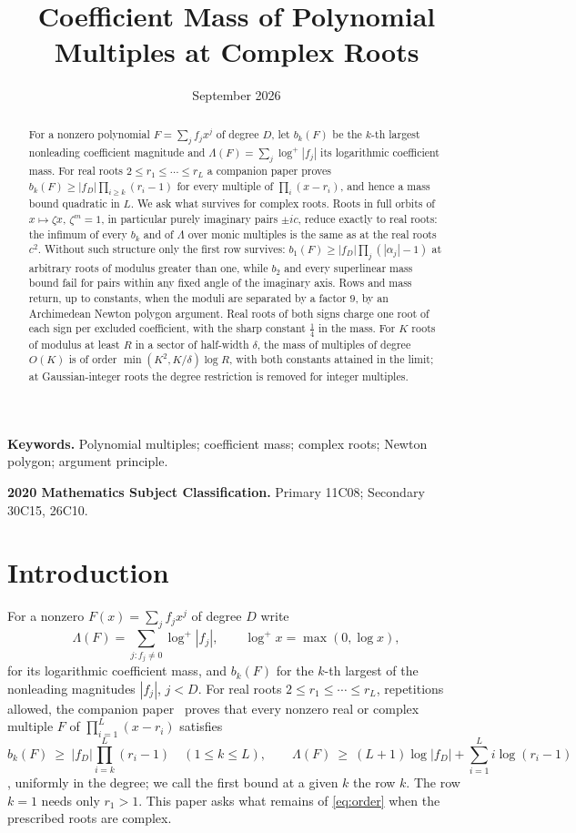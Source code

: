 \documentclass[11pt]{article}
\title{Coefficient Mass of Polynomial Multiples at Complex Roots}
\author{\shortstack{Bangyen Pham\\
\small Independent Researcher\\
\small\href{mailto:bangyenp@gmail.com}{\texttt{bangyenp@gmail.com}}\\
\small\href{https://orcid.org/0009-0006-9928-2088}{ORCID: 0009-0006-9928-2088}}}
\date{September 2026}
\begin{document}
\maketitle

\begin{abstract}
For a nonzero polynomial $F=\sum_jf_jx^j$ of degree $D$, let $b_k(F)$ be the
$k$-th largest nonleading coefficient magnitude and
$\Lambda(F)=\sum_j\log^+|f_j|$ its logarithmic coefficient mass.  For real
roots $2\le r_1\le\cdots\le r_L$ a companion paper proves
$b_k(F)\ge|f_D|\prod_{i\ge k}(r_i-1)$ for every multiple of
$\prod_i(x-r_i)$, and hence a mass bound quadratic in $L$.  We ask what
survives for complex roots.  Roots in full orbits of $x\mapsto\zeta x$,
$\zeta^m=1$, in particular purely imaginary pairs $\pm ic$, reduce exactly to
real roots: the infimum of every $b_k$ and of $\Lambda$ over monic multiples
is the same as at the real roots $c^2$.  Without such structure only the
first row survives: $b_1(F)\ge|f_D|\prod_j(|\alpha_j|-1)$ at arbitrary roots
of modulus greater than one, while $b_2$ and every superlinear mass bound
fail for pairs within any fixed angle of the imaginary axis.  Rows and mass
return, up to constants, when the moduli are separated by a factor $9$, by
an Archimedean Newton polygon argument.  Real roots of both signs charge one
root of each sign per excluded coefficient, with the sharp constant
$\frac14$ in the mass.  For $K$ roots of modulus at least $R$ in a sector of
half-width $\delta$, the mass of multiples of degree $O(K)$ is of order
$\min(K^2,K/\delta)\log R$, with both constants attained in the limit; at
Gaussian-integer roots the degree restriction is removed for integer
multiples.
\end{abstract}

\noindent\textbf{Keywords.} Polynomial multiples; coefficient mass; complex
roots; Newton polygon; argument principle.

\noindent\textbf{2020 Mathematics Subject Classification.} Primary 11C08; Secondary 30C15, 26C10.

\section{Introduction}

For a nonzero $F(x)=\sum_jf_jx^j$ of degree $D$ write
\[
  \Lambda(F)=\sum_{j:f_j\ne0}\log^+|f_j|,\qquad \log^+x=\max(0,\log x),
\]
for its logarithmic coefficient mass, and $b_k(F)$ for the $k$-th largest of
the nonleading magnitudes $|f_j|$, $j<D$.  For real roots
$2\le r_1\le\cdots\le r_L$, repetitions allowed, the companion
paper~\cite{coefficient-mass} proves that every nonzero real or complex
multiple $F$ of $\prod_{i=1}^L(x-r_i)$ satisfies
\begin{equation}\label{eq:order}
  b_k(F)\ \ge\ |f_D|\prod_{i=k}^L(r_i-1)\quad(1\le k\le L),
  \qquad
  \Lambda(F)\ \ge\ (L+1)\log|f_D|+\sum_{i=1}^Li\log(r_i-1)
\end{equation}
\cite[Theorem~3.2, Corollaries~3.3 and~3.4]{coefficient-mass}, uniformly in
the degree; we call the first bound at a given $k$ the row $k$.  The row
$k=1$ needs only $r_1>1$.  This paper asks what remains of
\eqref{eq:order} when the prescribed roots are complex.
\end{document}
